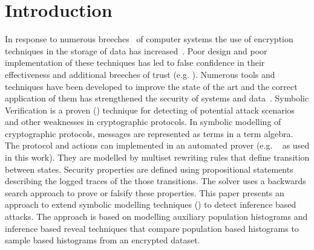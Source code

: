 \documentclass[runningheads]{llncs}
\begin{document}





\section{Introduction}
In response to numerous breeches~\cite{StateOfIS} of computer systems the use of encryption techniques in the storage of data has increased~\cite{Raghavendra2016}. Poor design and poor implementation of these techniques has led to false confidence in their effectiveness and additional breeches of trust (e.g. \cite{NewSouthWales}).
Numerous tools and techniques have been developed to improve the state of the  art and the correct application of them has strengthened the security of systems and data~\cite{SOK2017}.  
Symbolic Verification is a proven (\cite{Meier2013,5GAKA,18XOR}) technique for detecting of potential attack scenarios and other weaknesses in cryptographic protocols.
In symbolic modelling of cryptographic protocols, messages are represented as terms in a term algebra. The protocol and actions can implemented in an automated prover (e.g. \tamarin{}~\cite{Meyer2012} as used in this work). They are modelled by multiset rewriting rules that define transition between states. Security properties are defined using propositional statements describing the logged traces of the those transitions. The solver uses a backwards search approach to prove or falsify these properties. 
This paper presents an approach to extend symbolic modelling techniques (\cite{Meier2013,ObsEqvCCS15}) to detect inference based attacks. The approach is based on modelling auxiliary population histograms and inference based reveal techniques that compare  population based histograms to sample based histograms from an encrypted dataset.
\end{document}
